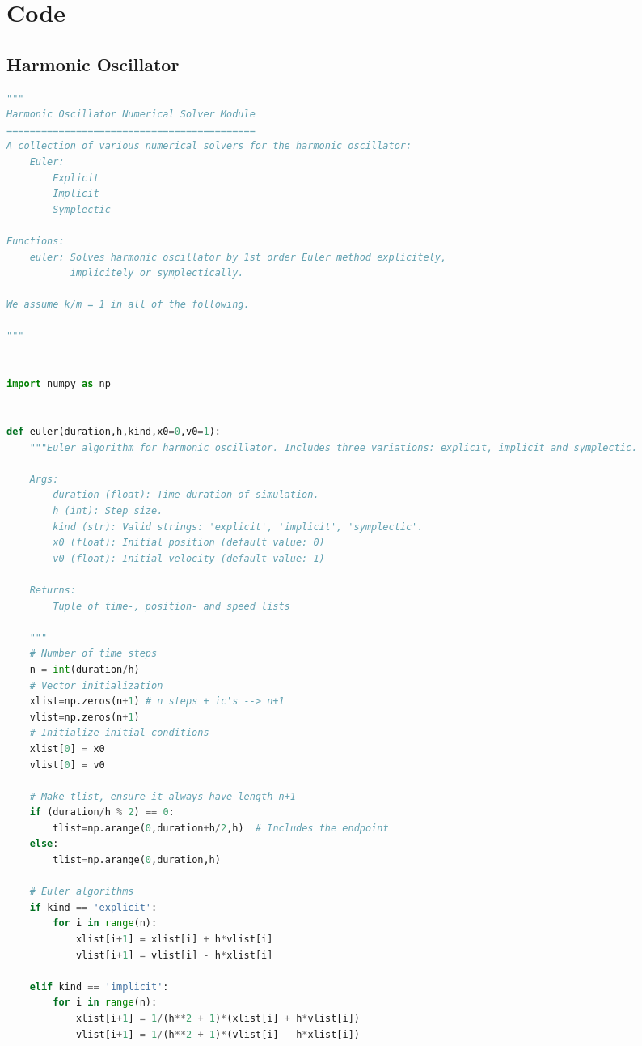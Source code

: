 \chapter{Code} \label{app:code-ho-pe}

\section{Harmonic Oscillator} \label{app:ho}
\begin{adjustwidth*}{0cm}{-0.4cm}
\begin{lstlisting}[language=Python]
"""
Harmonic Oscillator Numerical Solver Module
===========================================
A collection of various numerical solvers for the harmonic oscillator:
    Euler:
        Explicit
        Implicit
        Symplectic

Functions:
    euler: Solves harmonic oscillator by 1st order Euler method explicitely,
           implicitely or symplectically.

We assume k/m = 1 in all of the following.

"""


import numpy as np


def euler(duration,h,kind,x0=0,v0=1):
    """Euler algorithm for harmonic oscillator. Includes three variations: explicit, implicit and symplectic.

    Args:
        duration (float): Time duration of simulation.
        h (int): Step size.
        kind (str): Valid strings: 'explicit', 'implicit', 'symplectic'.
        x0 (float): Initial position (default value: 0)
        v0 (float): Initial velocity (default value: 1)

    Returns:
        Tuple of time-, position- and speed lists
    
    """
    # Number of time steps
    n = int(duration/h)
    # Vector initialization
    xlist=np.zeros(n+1) # n steps + ic's --> n+1
    vlist=np.zeros(n+1)
    # Initialize initial conditions
    xlist[0] = x0
    vlist[0] = v0

    # Make tlist, ensure it always have length n+1
    if (duration/h % 2) == 0:
        tlist=np.arange(0,duration+h/2,h)  # Includes the endpoint
    else:
        tlist=np.arange(0,duration,h)

    # Euler algorithms
    if kind == 'explicit':
        for i in range(n):
            xlist[i+1] = xlist[i] + h*vlist[i]
            vlist[i+1] = vlist[i] - h*xlist[i]

    elif kind == 'implicit':
        for i in range(n):
            xlist[i+1] = 1/(h**2 + 1)*(xlist[i] + h*vlist[i])
            vlist[i+1] = 1/(h**2 + 1)*(vlist[i] - h*xlist[i])
    

\end{lstlisting}
\end{adjustwidth*}
